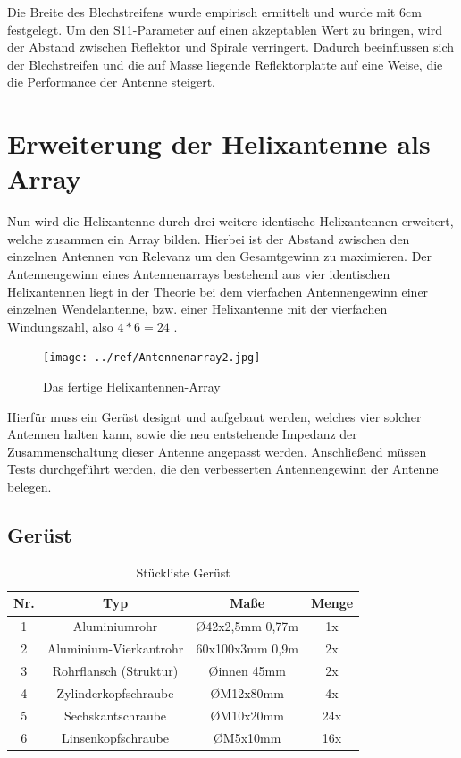 Die Breite des Blechstreifens wurde empirisch ermittelt und wurde mit 6cm festgelegt. Um den S11-Parameter auf einen akzeptablen Wert zu bringen, wird der Abstand zwischen Reflektor und Spirale verringert. Dadurch beeinflussen sich der Blechstreifen und die auf Masse liegende Reflektorplatte auf eine Weise, die die Performance der Antenne steigert.

\section{Erweiterung der Helixantenne als Array}
Nun wird die Helixantenne durch drei weitere identische Helixantennen erweitert, welche zusammen ein Array bilden. Hierbei ist der Abstand zwischen den einzelnen Antennen von Relevanz um den Gesamtgewinn zu maximieren.
Der Antennengewinn eines Antennenarrays bestehend aus vier identischen Helixantennen liegt in der Theorie bei dem vierfachen Antennengewinn einer einzelnen Wendelantenne, bzw. einer Helixantenne mit der vierfachen Windungszahl, also $4*6=24$ \cite[p. 319]{Kraus-2002-AntennasB}.

\begin{figure}[h!]
	\centering
	\texttt{[image: ../ref/Antennenarray2.jpg]}
	\caption{Das fertige Helixantennen-Array}
	\label{fig:helixantennen-array}
\end{figure}

Hierfür muss ein Gerüst designt und aufgebaut werden, welches vier solcher Antennen halten kann, sowie die neu entstehende Impedanz der Zusammenschaltung dieser Antenne angepasst werden. Anschließend müssen Tests durchgeführt werden, die den verbesserten Antennengewinn der Antenne belegen.

\subsection{Gerüst}
\label{subsec:helix_geruest}
\begin{table}
	\begin{tabular}{|c|c|c|c|}
	\hline
	Nr. & Typ & Maße & Menge \\
	\hline
	1 & Aluminiumrohr & \O42x2,5mm 0,77m & 1x \\
	\hline
	2 & Aluminium-Vierkantrohr & 60x100x3mm 0,9m & 2x \\
	\hline
	3 & Rohrflansch (Struktur) & \O innen 45mm & 2x\\
	\hline
	4 & Zylinderkopfschraube & \O M12x80mm & 4x\\
	\hline
	5 & Sechskantschraube & \O M10x20mm & 24x\\
	\hline
	6 & Linsenkopfschraube & \O M5x10mm & 16x\\
	\hline
\end{tabular}
\caption{Stückliste Gerüst}
\end{table}

